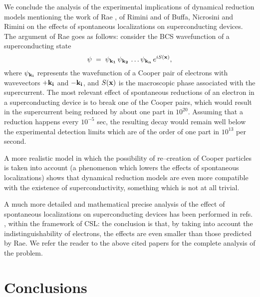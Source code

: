 \documentclass[12pt]{article}
\begin{document}
We conclude the analysis of the experimental implications of
dynamical reduction models mentioning the work of Rae \cite{rae},
of Rimini \cite{rimg} and of Buffa, Nicrosini and Rimini
\cite{bnr} on the effects of spontaneous localizations on
superconducting devices. The argument of Rae \cite{rae} goes as
follows: consider the BCS wavefunction \cite{bcs} of a
superconducting state
\begin{equation}
\psi \; = \; \psi_{\bf k_{1}}\, \psi_{\bf k_{2}}\, \ldots
\psi_{\bf k_{n}}\, e^{iS({\bf x})},
\end{equation}
where $\psi_{\bf k_{i}}$ represents the wavefunction of a Cooper
pair of electrons with wavevectors $+ {\bf k_{i}}$ and $- {\bf
k_{i}}$, and $S({\bf x})$ is the macroscopic phase associated with
the supercurrent. The most relevant effect of spontaneous
reductions of an electron in a superconducting device is to break
one of the Cooper pairs, which would result in the supercurrent
being reduced by about one part in $10^{20}$. Assuming that a
reduction happens every $10^{-5}$ sec, the resulting decay would
remain well below the experimental detection limits which are of
the order of one part in $10^{13}$ per second.

A more realistic model in which the possibility of re--creation of
Cooper particles is taken into account (a phenomenon which lowers
the effects of spontaneous localizations) shows that dynamical
reduction models are even more compatible with the existence of
superconductivity, something which is not at all trivial.

A much more detailed and mathematical precise analysis of the
effect of spontaneous localizations on superconducting devices has
been performed in refs. \cite{rimg,bnr}, within the framework of
CSL: the conclusion is that, by taking into account the
indistinguishability of electrons, the effects are even smaller
than those predicted by Rae. We refer the reader to the above
cited papers for the complete analysis of the problem.

\section{Conclusions}
\end{document}
